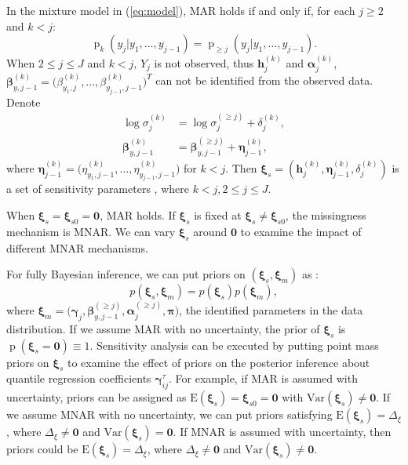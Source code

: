 \documentclass[12pt]{article}
\DeclareMathOperator{\pr}{p}
\begin{document}
In the mixture model in (\ref{eq:model}), MAR holds \citep{molen1998,
  wang2011} if and only if, for each $j \geq 2$ and $k < j$:
\begin{equation}
  \label{eq:molen}
  \pr_k(y_j|y_1, \ldots, y_{j-1}) = \pr_{\geq j}(y_j|y_1, \ldots, y_{j-1}).
\end{equation}
When $2 \leq j \leq J$ and $k < j$, $Y_j$ is not observed, thus $\bm
h_j^{(k)}$ and $\bm \alpha_j^{(k)}$, $ \bm \beta_{y, j-1}^{(k)} =
\big(\beta_{y_1,j}^{(k)}, \ldots, \beta_{y_{j-1},j-1}^{(k)} \big)^T $
can not be identified from the observed data. Denote
\begin{align*}
  \log \sigma_j^{(k)} &= \log \sigma_j^{(\geq j)} +  \delta_{j}^{(k)}, \\
  \bm \beta_{y, j-1}^{(k)} &= \bm \beta_{y, j-1}^{(\geq j)} + \bm
  \eta_{j-1}^{(k)},
\end{align*}
where  $\bm \eta_{j-1}^{(k)} = \big(
\eta_{y_1,j-1}^{(k)}, \ldots, \eta_{y_{j-1}, j-1}^{(k)} \big)$ for $k
< j$. Then $\bm \xi_s = ( \bm h_j^{(k)}, \bm \eta_{j-1}^{(k)},
\delta_j^{(k)})$ is a set of sensitivity parameters \citep{dh2008},
where $k < j, 2 \leq j \leq J $.

When $\bm \xi_s = \bm \xi_{s0} = \bm 0$, MAR holds. If $\bm \xi_s$ is
fixed at $\bm \xi_s \neq \bm \xi_{s0}$, the missingness mechanism is
MNAR. We can vary $\bm \xi_s$ around $\bm 0$ to examine the impact of
different MNAR mechanisms.

For fully Bayesian inference, we can put priors on $(\bm \xi_s, \bm
\xi_m)$ as :
\begin{displaymath}
  p(\bm \xi_s, \bm \xi_m) = p(\bm \xi_s) p(\bm \xi_m),
\end{displaymath}
where $\bm \xi_m = \big(\bm \gamma_j, \bm \beta_{y, j-1}^{(\geq j)},
\bm \alpha_j^{(\geq j)}, \bm \pi \big)$, the identified parameters in
the data distribution.  If we assume MAR with no uncertainty, the
prior of $\bm \xi_s$ is $\pr(\bm \xi_s = \bm 0) \equiv 1$. Sensitivity
analysis can be executed by putting point mass priors on $\bm \xi_s$
to examine the effect of priors on the posterior inference about
quantile regression coefficients $\bm \gamma_{ij}^{\tau}$. For
example, if MAR is assumed with uncertainty, priors can be assigned as
$\textrm{E}(\bm \xi_s) = \bm \xi_{s0} = \bm 0$ with $\textrm{Var}(\bm
\xi_s) \neq \bm 0$. If we assume MNAR with no uncertainty, we can put
priors satisfying $\textrm{E}(\bm \xi_s) = \Delta_{\xi}$, where
$\Delta_{\xi} \neq \bm 0$ and $\textrm{Var}(\bm \xi_s) = \bm 0$. If
MNAR is assumed with uncertainty, then priors could be $\textrm{E}(\bm
\xi_s) = \Delta_{\xi}$, where $\Delta_{\xi} \neq \bm 0 $ and
$\textrm{Var}(\bm \xi_s) \neq \bm 0$.
\end{document}
